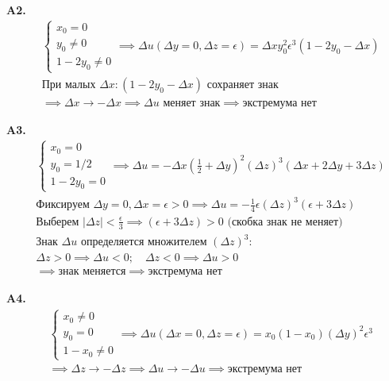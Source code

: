 \documentclass[12pt]{article}
\begin{document}
\noindent \textbf{A2.}
\begin{align*}
&\begin{cases} x_0 = 0 \\ y_0 \neq 0 \\ 1 - 2y_0 \neq 0 \end{cases} \implies \Delta u(\Delta y=0, \Delta z=\epsilon) = \Delta x y_0^2 \epsilon^3 (1 - 2y_0 - \Delta x) \\
&\text{При малых } \Delta x: (1 - 2y_0 - \Delta x) \text{ сохраняет знак} \\
&\implies \Delta x \to -\Delta x \implies \Delta u \text{ меняет знак} \implies \text{экстремума нет}
\end{align*}

\noindent \textbf{A3.}
\begin{align*}
&\begin{cases} x_0 = 0 \\ y_0 = 1/2 \\ 1 - 2y_0 = 0 \end{cases} \implies \Delta u = -\Delta x \left(\frac{1}{2}+\Delta y\right)^2(\Delta z)^3(\Delta x+2\Delta y+3\Delta z) \\
&\text{Фиксируем } \Delta y = 0, \Delta x = \epsilon > 0 \implies \Delta u = -\frac{1}{4}\epsilon(\Delta z)^3(\epsilon + 3\Delta z) \\
&\text{Выберем } |\Delta z| < \frac{\epsilon}{3} \implies (\epsilon + 3\Delta z) > 0 \text{ (скобка знак не меняет)} \\
&\text{Знак } \Delta u \text{ определяется множителем } (\Delta z)^3: \\
&\Delta z > 0 \implies \Delta u < 0; \quad \Delta z < 0 \implies \Delta u > 0 \\
&\implies \text{знак меняется} \implies \text{экстремума нет}
\end{align*}

\noindent \textbf{A4.}
\begin{align*}
&\begin{cases} x_0 \neq 0 \\ y_0 = 0 \\ 1 - x_0 \neq 0 \end{cases} \implies \Delta u(\Delta x=0, \Delta z=\epsilon) = x_0 (1 - x_0) (\Delta y)^2 \epsilon^3 \\
&\implies \Delta z \to -\Delta z \implies \Delta u \to -\Delta u \implies \text{экстремума нет}
\end{align*}
\end{document}
